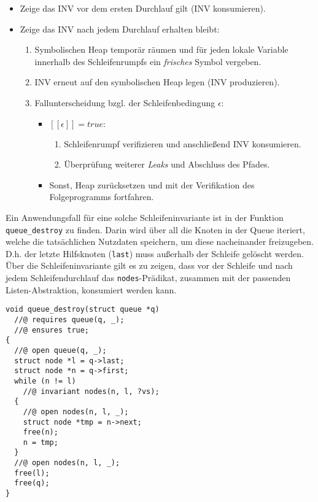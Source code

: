 \begin{itemize}
	\item Zeige das INV vor dem ersten Durchlauf gilt (INV konsumieren).
	\item Zeige das INV nach jedem Durchlauf erhalten bleibt:
	\begin{enumerate}
		\item Symbolischen Heap temporär räumen und für jeden lokale Variable innerhalb des Schleifenrumpfs ein \emph{frisches} Symbol vergeben.
		\item INV erneut auf den symbolischen Heap legen (INV produzieren).
		\item Fallunterscheidung bzgl. der Schleifenbedingung $\epsilon$:
		\begin{itemize}
			\item $[\![\epsilon]\!] = true:$
			\begin{enumerate}
				\item Schleifenrumpf verifizieren und anschließend INV konsumieren.
				\item Überprüfung weiterer \emph{Leaks} und Abschluss des Pfades.
			\end{enumerate}
			\item Sonst, Heap zurücksetzen und mit der Verifikation des Folgeprogramms fortfahren.
		\end{itemize}
	\end{enumerate}
\end{itemize}

\noindent
Ein Anwendungsfall für eine solche Schleifeninvariante ist in der Funktion \texttt{queue\_destroy} zu finden. Darin wird über all die Knoten in der Queue iteriert, welche die tatsächlichen Nutzdaten speichern, um diese nacheinander freizugeben. D.h. der letzte Hilfsknoten (\texttt{last}) muss außerhalb der Schleife gelöscht werden. Über die Schleifeninvariante gilt es zu zeigen, dass vor der Schleife und nach jedem Schleifendurchlauf das \texttt{nodes}-Prädikat, zusammen mit der passenden Listen-Abstraktion, konsumiert werden kann. 

\begin{lstlisting}
void queue_destroy(struct queue *q)
  //@ requires queue(q, _);
  //@ ensures true;
{
  //@ open queue(q, _);
  struct node *l = q->last;
  struct node *n = q->first;
  while (n != l)
    //@ invariant nodes(n, l, ?vs);
  {
    //@ open nodes(n, l, _);
    struct node *tmp = n->next;
    free(n);
    n = tmp;
  }
  //@ open nodes(n, l, _);
  free(l);
  free(q);
}
\end{lstlisting}

